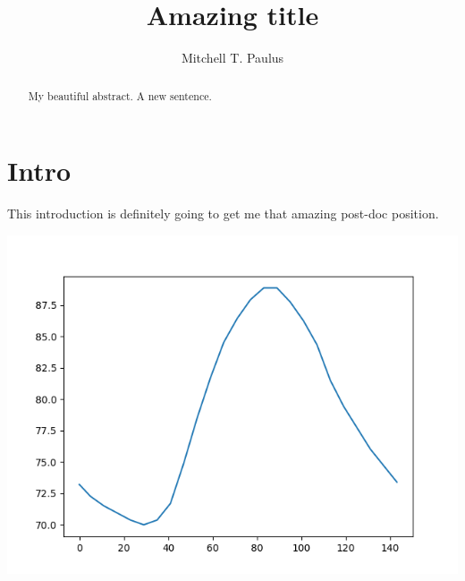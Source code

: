 \documentclass{article}
\author{Mitchell T. Paulus}
\title{Amazing title}
\begin{document}
\maketitle{}

\begin{abstract}
My beautiful abstract. A new sentence.
\end{abstract}

\section{Intro}

This introduction is definitely going to get me that amazing post-doc
position.

\includegraphics{eplusout.png}
\end{document}
